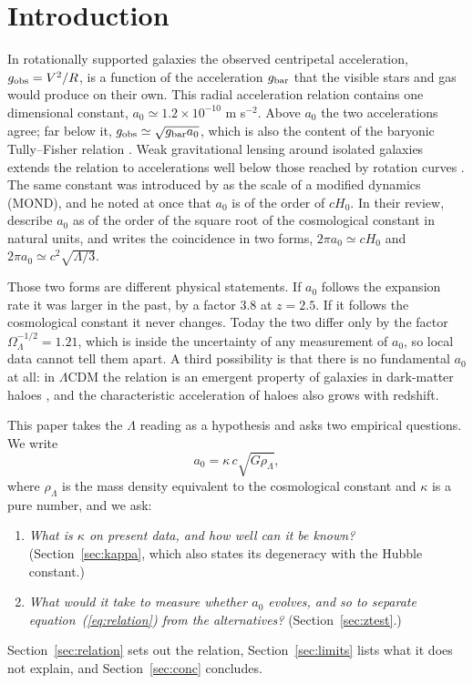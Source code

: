\documentclass[fleqn,usenatbib]{mnras}
\begin{document}
\section{Introduction}
\label{sec:intro}
In rotationally supported galaxies the observed centripetal acceleration, $g_{\rm obs}=V^2/R$, is a function of the acceleration $g_{\rm bar}$ that the visible stars and gas would produce on their own. This radial acceleration relation \citep{McGaugh2016,Lelli2017} contains one dimensional constant, $a_0\simeq1.2\times10^{-10}$ m s$^{-2}$. Above $a_0$ the two accelerations agree; far below it, $g_{\rm obs}\simeq\sqrt{g_{\rm bar}a_0}$, which is also the content of the baryonic Tully--Fisher relation \citep{McGaugh2012,Lelli2019}. Weak gravitational lensing around isolated galaxies extends the relation to accelerations well below those reached by rotation curves \citep{Brouwer2021,Mistele2024}. The same constant was introduced by \citet{Milgrom1983} as the scale of a modified dynamics (MOND), and he noted at once that $a_0$ is of the order of $cH_0$. In their review, \citet{FamaeyMcGaugh2012} describe $a_0$ as of the order of the square root of the cosmological constant in natural units, and \citet{Milgrom2020} writes the coincidence in two forms, $2\pi a_0\simeq cH_0$ and $2\pi a_0\simeq c^2\sqrt{\Lambda/3}$.

Those two forms are different physical statements. If $a_0$ follows the expansion rate it was larger in the past, by a factor $3.8$ at $z=2.5$. If it follows the cosmological constant it never changes. Today the two differ only by the factor $\Omega_\Lambda^{-1/2}=1.21$, which is inside the uncertainty of any measurement of $a_0$, so local data cannot tell them apart. A third possibility is that there is no fundamental $a_0$ at all: in $\Lambda$CDM the relation is an emergent property of galaxies in dark-matter haloes \citep{Navarro2017,Ludlow2017,KellerWadsley2017}, and the characteristic acceleration of haloes also grows with redshift.

This paper takes the $\Lambda$ reading as a hypothesis and asks two empirical questions. We write
\begin{equation}
a_0=\kappa\,c\sqrt{G\rho_\Lambda},
\label{eq:relation}
\end{equation}
where $\rho_\Lambda$ is the mass density equivalent to the cosmological constant and $\kappa$ is a pure number, and we ask:
\begin{enumerate}
\item \emph{What is $\kappa$ on present data, and how well can it be known?} (Section~\ref{sec:kappa}, which also states its degeneracy with the Hubble constant.)
\item \emph{What would it take to measure whether $a_0$ evolves, and so to separate equation~(\ref{eq:relation}) from the alternatives?} (Section~\ref{sec:ztest}.)
\end{enumerate}
Section~\ref{sec:relation} sets out the relation, Section~\ref{sec:limits} lists what it does not explain, and Section~\ref{sec:conc} concludes.
\end{document}

